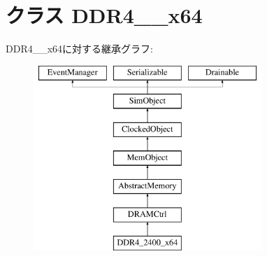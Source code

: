 \hypertarget{classDRAMCtrl_1_1DDR4__2400__x64}{
\section{クラス DDR4\_\_\-x64}
\label{classDRAMCtrl_1_1DDR4__2400__x64}
}
DDR4\_\_\-x64に対する継承グラフ:\begin{figure}[H]
\begin{center}
\leavevmode
\includegraphics[height=7cm]{classDRAMCtrl_1_1DDR4__2400__x64}
\end{center}
\end{figure}
